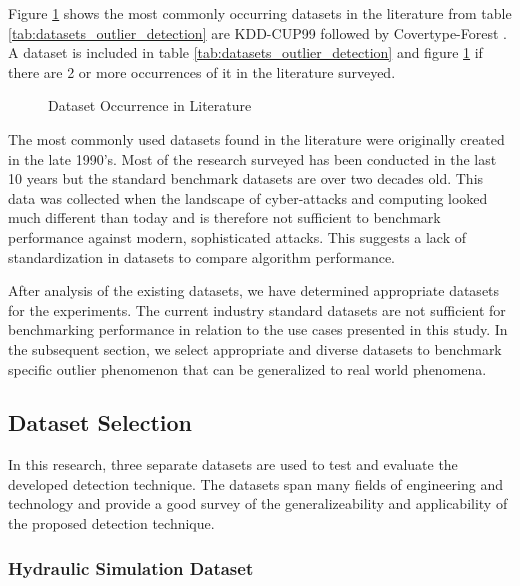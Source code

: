 

Figure \ref{fig_dataset_lit} shows the most commonly occurring datasets in the literature from table \ref{tab:datasets_outlier_detection} are KDD-CUP99 \parencite{kdd1999} followed by Covertype-Forest \parencite{covertype-dataset}. A dataset is included in table \ref{tab:datasets_outlier_detection} and figure \ref{fig_dataset_lit} if there are 2 or more occurrences of it in the literature surveyed.

\begin{figure}[H]
    
    \caption{Dataset Occurrence in Literature }
    \label{fig_dataset_lit}
\end{figure}

The most commonly used datasets found in the literature were originally created in the late 1990's. Most of the research surveyed has been conducted in the last 10 years but the standard benchmark datasets are over two decades old. This data was collected when the landscape of cyber-attacks and computing looked much different than today and is therefore not sufficient to benchmark performance against modern, sophisticated attacks. This suggests a lack of standardization in datasets to compare algorithm performance.

After analysis of the existing datasets, we have determined appropriate datasets for the experiments. The current industry standard datasets are not sufficient for benchmarking performance in relation to the use cases presented in this study. In the subsequent section, we select appropriate and diverse datasets to benchmark specific outlier phenomenon that can be generalized to real world phenomena.

\subsection{Dataset Selection}
\label{ref_datasets}

In this research, three separate datasets are used to test and evaluate the developed detection technique. The datasets span many fields of engineering and technology and provide a good survey of the generalizeability and applicability of the proposed detection technique.

\subsubsection{Hydraulic Simulation Dataset}
\label{ref_hydraulic_dataset}

